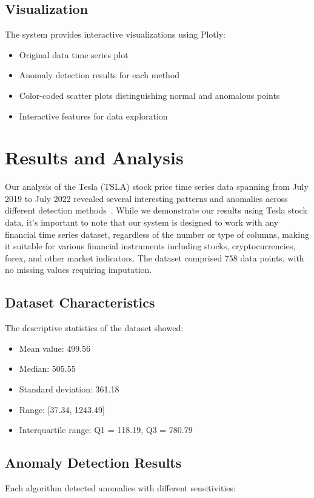 \documentclass[conference]{IEEEtran}
\begin{document}
\subsection{Visualization}
The system provides interactive visualizations using Plotly:
\begin{itemize}
    \item Original data time series plot
    \item Anomaly detection results for each method
    \item Color-coded scatter plots distinguishing normal and anomalous points
    \item Interactive features for data exploration
\end{itemize}

\section{Results and Analysis}
Our analysis of the Tesla (TSLA) stock price time series data spanning from July 2019 to July 2022 revealed several interesting patterns and anomalies across different detection methods~\cite{parimi2024}. While we demonstrate our results using Tesla stock data, it's important to note that our system is designed to work with any financial time series dataset, regardless of the number or type of columns, making it suitable for various financial instruments including stocks, cryptocurrencies, forex, and other market indicators. The dataset comprised 758 data points, with no missing values requiring imputation.

\subsection{Dataset Characteristics}
The descriptive statistics of the dataset showed:
\begin{itemize}
    \item Mean value: 499.56
    \item Median: 505.55
    \item Standard deviation: 361.18
    \item Range: [37.34, 1243.49]
    \item Interquartile range: Q1 = 118.19, Q3 = 780.79
\end{itemize}

\subsection{Anomaly Detection Results}
Each algorithm detected anomalies with different sensitivities:
\end{document}
